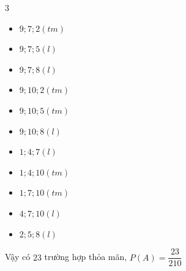 \begin{bt}
{\begin{multicols}{3}
\begin{itemize}
				\item $9;7;2(tm) $ 
				\item $ 9;7;5 (l)$ 
				\item   $ 9;7;8(l)$ 
				\item $9;10;2 (tm)$ 
				\item $9;10;5(tm) $ 
				\item $9;10;8(l) $
				\item $1;4;7(l) $
				\item $1;4;10 (tm) $
				\item $ 1;7;10(tm)$
				\item $4;7;10(l) $
				\item $2;5;8(l) $     
			\end{itemize}  
		\end{multicols}
		Vậy có $ 23 $ trường hợp thỏa mãn, $ P(A)= \dfrac{23}{210}$  
	}
\end{bt}


